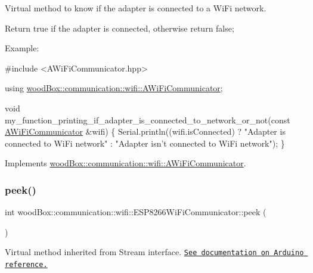 Virtual method to know if the adapter is connected to a Wi\+Fi network.

Return true if the adapter is connected, otherwise return false;

Example\+:


\begin{DoxyCode}
\textcolor{preprocessor}{#include <AWiFiCommunicator.hpp>}

\textcolor{keyword}{using} \mbox{\hyperlink{classwood_box_1_1communication_1_1wifi_1_1_a_wi_fi_communicator}{woodBox::communication::wifi::AWiFiCommunicator}};

\textcolor{keywordtype}{void} my\_function\_printing\_if\_adapter\_is\_connected\_to\_network\_or\_not(\textcolor{keyword}{const} 
      \mbox{\hyperlink{classwood_box_1_1communication_1_1wifi_1_1_a_wi_fi_communicator_a9d1dc13ca9243170b04211bef2b86ed2}{AWiFiCommunicator}} &wifi) \{
  Serial.println((wifi.isConnected) ? \textcolor{stringliteral}{"Adapter is connected to WiFi network"} : \textcolor{stringliteral}{"Adapter isn't connected to
       WiFi network"});
\}
\end{DoxyCode}
 

Implements \mbox{\hyperlink{classwood_box_1_1communication_1_1wifi_1_1_a_wi_fi_communicator_aa2a58b4178054b3129d711f62640a6bf}{wood\+Box\+::communication\+::wifi\+::\+A\+Wi\+Fi\+Communicator}}.

\mbox{\label{classwood_box_1_1communication_1_1wifi_1_1_e_s_p8266_wi_fi_communicator_accc6832fa7351cb977b9e3a805dc8107}} 
\subsubsection{\texorpdfstring{peek()}{peek()}}
{\footnotesize\ttfamily int wood\+Box\+::communication\+::wifi\+::\+E\+S\+P8266\+Wi\+Fi\+Communicator\+::peek (\begin{DoxyParamCaption}{ }\end{DoxyParamCaption})\hspace{0.3cm}{\ttfamily [virtual]}}

Virtual method inherited from Stream interface. \href{https://www.arduino.cc/reference/en/language/functions/communication/stream/streampeek/}{\tt See documentation on Arduino reference.} 

